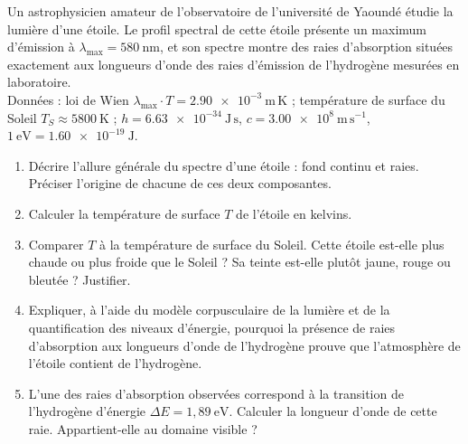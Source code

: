 \documentclass[11pt]{article}
\begin{document}
\begin{exercice}
Un astrophysicien amateur de l'observatoire de l'université de Yaoundé étudie la lumière d'une étoile. Le profil spectral de cette étoile présente un maximum d'émission à $\lambda_{\max} = 580\ \mathrm{nm}$, et son spectre montre des raies d'absorption situées exactement aux longueurs d'onde des raies d'émission de l'hydrogène mesurées en laboratoire.\\
Données : loi de Wien $\lambda_{\max} \cdot T = \num{2,90e-3}\ \mathrm{m\,K}$ ; température de surface du Soleil $T_S \approx \num{5800}\ \mathrm{K}$ ; $h = \num{6,63e-34}\ \mathrm{J\,s}$, $c = \num{3,00e8}\ \mathrm{m\,s^{-1}}$, $1\ \mathrm{eV} = \num{1,60e-19}\ \mathrm{J}$.
\begin{enumerate}
\item Décrire l'allure générale du spectre d'une étoile : fond continu et raies. Préciser l'origine de chacune de ces deux composantes.
\item Calculer la température de surface $T$ de l'étoile en kelvins.
\item Comparer $T$ à la température de surface du Soleil. Cette étoile est-elle plus chaude ou plus froide que le Soleil ? Sa teinte est-elle plutôt jaune, rouge ou bleutée ? Justifier.
\item Expliquer, à l'aide du modèle corpusculaire de la lumière et de la quantification des niveaux d'énergie, pourquoi la présence de raies d'absorption aux longueurs d'onde de l'hydrogène prouve que l'atmosphère de l'étoile contient de l'hydrogène.
\item L'une des raies d'absorption observées correspond à la transition de l'hydrogène d'énergie $\Delta E = 1{,}89\ \mathrm{eV}$. Calculer la longueur d'onde de cette raie. Appartient-elle au domaine visible ?
\end{enumerate}
\end{exercice}
\end{document}

